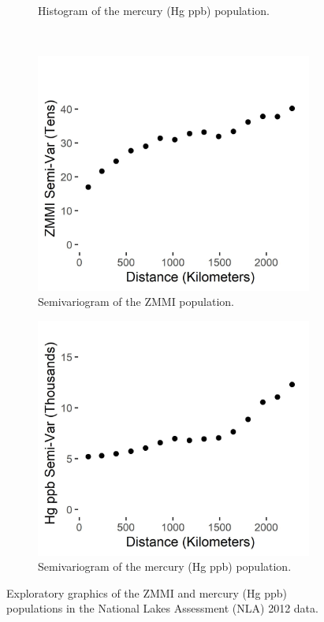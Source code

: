 \documentclass[]{elsarticle} %
\begin{document}
\begin{figure}
\begin{subfigure}{0.49\textwidth}
  \caption{Histogram of the mercury (Hg ppb) population.}
  \label{fig:mercury_hist}
\end{subfigure} \\
\begin{subfigure}{0.49\textwidth}
  \centering
  \includegraphics[width = 1\linewidth]{figures/zmmi_sv.jpeg}
  \caption{Semivariogram of the ZMMI population.}
  \label{fig:zmmi_sv_plot}
\end{subfigure}
\begin{subfigure}{0.49\textwidth}
  \centering
  \includegraphics[width = 1\linewidth]{figures/mercury_sv.jpeg}
  \caption{Semivariogram of the mercury (Hg ppb) population.}
  \label{fig:mercury_sv_plot}
\end{subfigure}
\caption{Exploratory graphics of the ZMMI and mercury (Hg ppb) populations in the National Lakes Assessment (NLA) 2012 data.}
\label{fig:zmmi}
\end{figure}
\end{document}
